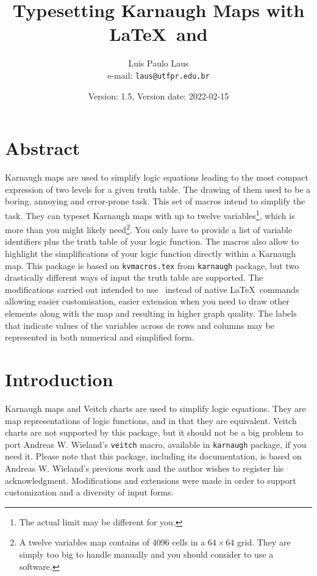 \documentclass[a4paper]{ltxdoc}
\begin{document}
\title{Typesetting Karnaugh Maps with \LaTeX\ and \tikzname}
\author{Luis Paulo Laus\\e-mail: \texttt{laus@utfpr.edu.br}}
\date{Version: 1.5, Version date: 2022-02-15}

\maketitle


\section*{Abstract}

Karnaugh maps are used to simplify logic equations leading to the most compact expression of two levels for a given truth table. The drawing of them used to be a boring, annoying and error-prone task. This set of macros intend to simplify the task. They can typeset Karnaugh maps with up to twelve variables\footnote{The actual limit may be different for you.}, which is more than you might likely need\footnote{A twelve variables map contains of 4096 cells in a $64\times64$ grid. They are simply too big to handle manually and you should consider to use a software.}. You only have to provide a list of variable identifiers plus the truth table of your logic function. The macros also allow to highlight the simplifications of your logic function directly within a Karnaugh map. This package is based on \verb|kvmacros.tex| from \verb|karnaugh| package, but two drastically different ways of input the truth table are supported. The modifications carried out intended to use \tikzname\ instead of native \LaTeX\ commands allowing easier customisation, easier extension when you need to draw other elements along with the map and resulting in higher graph quality. The labels that indicate values of the variables across de rows and columns may be represented in both numerical and simplified form.


\section{Introduction}

Karnaugh maps \cite{Karnaugh} and Veitch charts are used to simplify logic equations. They are map representations of logic functions, and in that they are equivalent. Veitch charts are not supported by this package, but it should not be a big problem to port Andreas W. Wieland's \verb|veitch| macro, available in \verb|karnaugh| package, if you need it.
Please note that this package, including its documentation, is based on Andreas W. Wieland's previous work and the author wishes to register his acknowledgment. Modifications and extensions were made in order to support customization and a diversity of input forms.
\end{document}

